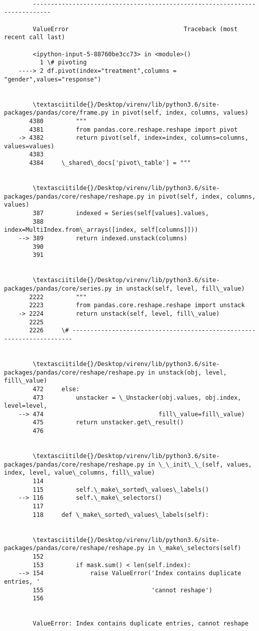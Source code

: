 \documentclass[11pt]{article}
\begin{document}
    \begin{Verbatim}[commandchars=\\\{\}]

        ---------------------------------------------------------------------------

        ValueError                                Traceback (most recent call last)

        <ipython-input-5-88760be3cc73> in <module>()
          1 \# pivoting
    ----> 2 df.pivot(index="treatment",columns = "gender",values="response")
    

        \textasciitilde{}/Desktop/virenv/lib/python3.6/site-packages/pandas/core/frame.py in pivot(self, index, columns, values)
       4380         """
       4381         from pandas.core.reshape.reshape import pivot
    -> 4382         return pivot(self, index=index, columns=columns, values=values)
       4383 
       4384     \_shared\_docs['pivot\_table'] = """


        \textasciitilde{}/Desktop/virenv/lib/python3.6/site-packages/pandas/core/reshape/reshape.py in pivot(self, index, columns, values)
        387         indexed = Series(self[values].values,
        388                          index=MultiIndex.from\_arrays([index, self[columns]]))
    --> 389         return indexed.unstack(columns)
        390 
        391 


        \textasciitilde{}/Desktop/virenv/lib/python3.6/site-packages/pandas/core/series.py in unstack(self, level, fill\_value)
       2222         """
       2223         from pandas.core.reshape.reshape import unstack
    -> 2224         return unstack(self, level, fill\_value)
       2225 
       2226     \# ----------------------------------------------------------------------


        \textasciitilde{}/Desktop/virenv/lib/python3.6/site-packages/pandas/core/reshape/reshape.py in unstack(obj, level, fill\_value)
        472     else:
        473         unstacker = \_Unstacker(obj.values, obj.index, level=level,
    --> 474                                fill\_value=fill\_value)
        475         return unstacker.get\_result()
        476 


        \textasciitilde{}/Desktop/virenv/lib/python3.6/site-packages/pandas/core/reshape/reshape.py in \_\_init\_\_(self, values, index, level, value\_columns, fill\_value)
        114 
        115         self.\_make\_sorted\_values\_labels()
    --> 116         self.\_make\_selectors()
        117 
        118     def \_make\_sorted\_values\_labels(self):


        \textasciitilde{}/Desktop/virenv/lib/python3.6/site-packages/pandas/core/reshape/reshape.py in \_make\_selectors(self)
        152 
        153         if mask.sum() < len(self.index):
    --> 154             raise ValueError('Index contains duplicate entries, '
        155                              'cannot reshape')
        156 


        ValueError: Index contains duplicate entries, cannot reshape

    \end{Verbatim}
\end{document}
